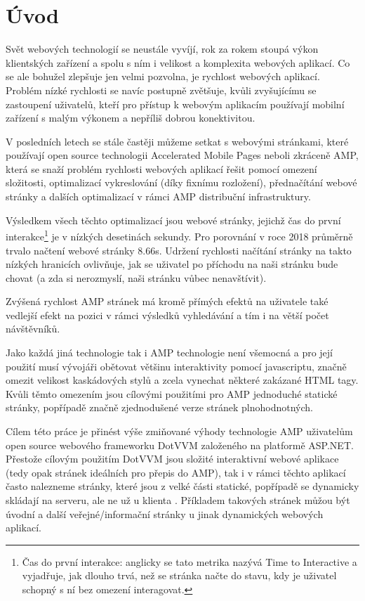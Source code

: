 \chapter{Úvod}

Svět webových technologií se neustále vyvíjí, rok za rokem stoupá výkon klientských zařízení a spolu s
ním i velikost a komplexita webových aplikací. Co se ale bohužel zlepšuje jen velmi pozvolna, je rychlost
webových aplikací. Problém nízké rychlosti se navíc postupně zvětšuje, kvůli zvyšujícímu se zastoupení
uživatelů, kteří pro přístup k webovým aplikacím používají mobilní zařízení s malým výkonem a nepříliš
dobrou konektivitou.

V posledních letech se stále častěji můžeme setkat s webovými stránkami, které používají open source technologii Accelerated Mobile Pages neboli zkráceně AMP, která se snaží problém rychlosti webových aplikací
řešit pomocí omezení složitosti, optimalizací vykreslování (díky fixnímu rozložení), přednačítání webové
stránky a dalších optimalizací v rámci AMP distribuční infrastruktury.

Výsledkem všech těchto optimalizací jsou webové stránky, jejichž čas do první interakce\footnote{Čas do první interakce: anglicky se tato metrika nazývá Time to Interactive a vyjadřuje, jak dlouho trvá, než se stránka načte do stavu, kdy je uživatel schopný s ní bez omezení interagovat.} je v nízkých desetinách sekundy. Pro porovnání v roce 2018 průměrně trvalo načtení webové
stránky 8.66s\cite{TTI}.
Udržení rychlosti načítání stránky na takto nízkých hranicích ovlivňuje, jak se uživatel po příchodu na naši
stránku bude chovat (a zda si nerozmyslí, naši stránku vůbec nenavštívit).

Zvýšená rychlost AMP stránek má kromě přímých efektů na uživatele také vedlejší efekt na pozici
v rámci výsledků vyhledávání a tím i na větší počet návštěvníků.

Jako každá jiná technologie tak i AMP technologie není všemocná a pro její použití musí vývojáři
obětovat většinu interaktivity pomocí javascriptu, značně omezit velikost kaskádových stylů a zcela
vynechat některé zakázané HTML tagy. Kvůli těmto omezením jsou cílovými použitími pro AMP jednoduché statické stránky, popřípadě značně
zjednodušené verze stránek plnohodnotných.

Cílem této práce je přinést výše zmiňované výhody technologie AMP uživatelům open source webového
frameworku DotVVM založeného na platformě ASP.NET.
Přestože cílovým použitím DotVVM jsou složité interaktivní webové aplikace (tedy opak stránek ideálních pro přepis do AMP), tak i v rámci těchto aplikací často nalezneme stránky, které jsou z velké části statické, popřípadě se dynamicky skládají na serveru, ale ne už u klienta \cite{DotVVMIntro}. Příkladem takových stránek můžou být úvodní a další veřejné/informační stránky u jinak dynamických webových aplikací. 

